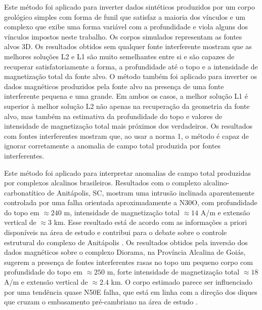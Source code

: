 Este método foi aplicado para inverter dados sintéticos produzidos por um corpo geológico simples com forma de funil que satisfaz a maioria dos vínculos e um complexo que exibe uma forma variável com a profundidade e viola alguns dos vínculos impostos neste trabalho.
Os corpos simulados representam as fontes alvos 3D.
Os resultados obtidos sem qualquer fonte interferente mostram que as melhores soluções L2 e L1 são muito semelhantes entre si e são capazes de recuperar satisfatoriamente a forma, a profundidade até o topo e a intensidade de magnetização total da fonte alvo.
O método também foi aplicado para inverter os dados magnéticos produzidos pela fonte alvo na presença de uma fonte interferente pequena e uma grande.
Em ambos os casos, a melhor solução L1 é superior à melhor solução L2 não apenas na recuperação da geometria da fonte alvo, mas também na estimativa da profundidade do topo e valores de intensidade de magnetização total mais próximos dos verdadeiros.
Os resultados com fontes interferentes mostram que, ao usar a norma 1, o método é capaz de ignorar corretamente a anomalia de campo total produzida por fontes interferentes.

Este método foi aplicado para interpretar anomalias de campo total produzidas por complexos alcalinos brasileiros. Resultados com o complexo alcalino-carbonatítico de Anitápolis, SC, mostram uma intrusão inclinada aparentemente controlada por uma falha orientada aproximadamente a N30O, com profundidade do topo em $\approx 240$ m, intensidade de magnetização total $\approx 14$ A/m e extensão vertical de $\approx 3$ km. Esse resultado está de acordo com as informações a priori disponíveis na área de estudo e contribui para o debate sobre o controle estrutural do complexo de Anitápolis \citep{riccomini_etal2005, gomes_etal2018}.
Os resultados obtidos pela inversão dos dados magnéticos sobre o complexo Diorama, na Província Alcalina de Goiás, sugerem a presença de fontes interferentes rasas no topo um pequeno corpo com profundidade do topo em $\approx 250$ m, forte intensidade de magnetização total $\approx 18$ A/m e extensão vertical de $\approx 2.4$ km. O corpo estimado parece ser influenciado por uma tendência quase N50E falha, que está em linha com a direção dos diques que cruzam o embasamento pré-cambriano na área de estudo \citet{junqueirabrod_etal2002}.